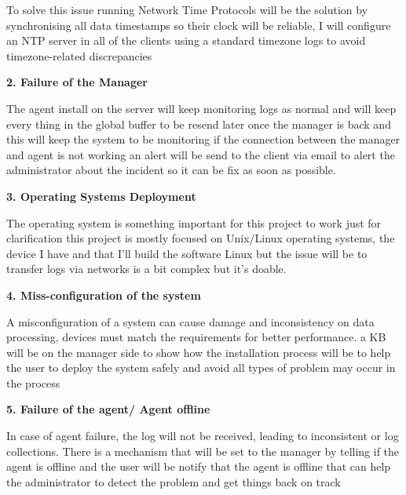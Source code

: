 To solve this issue running Network Time Protocols will be the solution by synchronising all data timestamps so their clock will be reliable, I will configure an NTP server in all of the clients using a standard timezone logs to avoid timezone-related discrepancies 


\textbf{2. Failure of the Manager}



The agent install on the server will keep monitoring logs as normal and will keep every thing in the global buffer to be resend later once the manager is back and this will keep the system to be monitoring if the connection between the manager and agent is not working an alert will be send to the client  via email to alert the administrator about the incident so it can be fix as soon as possible.



\textbf{3. Operating Systems Deployment}


The operating system is something important for this project to work just for clarification this project is mostly focused on Unix/Linux operating systems, the device I have and that I'll build the software  Linux but the issue will be to transfer logs via networks is a bit complex but it's doable.


\textbf{4. Miss-configuration  of the system}


A misconfiguration of a system can cause damage and inconsistency on data processing, devices must match the requirements for better performance. a KB will be on the manager side to show how the installation process will be to help the user to deploy the system safely and avoid all types of problem may occur in the process 


\textbf{5. Failure of the agent/ Agent offline}


In case of agent failure, the log will not be received, leading to inconsistent or log collections. There is a mechanism that will be set to the manager by telling if the agent is offline and the user will be notify that the agent is offline that can help the administrator to detect the problem and get things back on track


